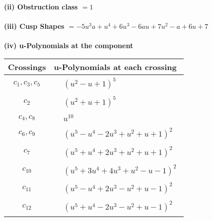 \documentclass[1p]{elsarticle_modified}
\theoremstyle{definition}
\begin{document}
\flushleft \textbf{(ii) Obstruction class $= 1$}\\~\\
\flushleft \textbf{(iii) Cusp Shapes $= -5 u^3 a+u^4+6 u^3-6 a u+7 u^2- a+6 u+7$}\\~\\
\newpage\renewcommand{\arraystretch}{1}
\flushleft \textbf{(iv) u-Polynomials at the component}\newline \\
\begin{tabular}{m{50pt}|m{274pt}}
Crossings & \hspace{64pt}u-Polynomials at each crossing \\
\hline $$\begin{aligned}c_{1},c_{3},c_{5}\end{aligned}$$&$\begin{aligned}
&(u^2- u+1)^5
\end{aligned}$\\
\hline $$\begin{aligned}c_{2}\end{aligned}$$&$\begin{aligned}
&(u^2+u+1)^5
\end{aligned}$\\
\hline $$\begin{aligned}c_{4},c_{8}\end{aligned}$$&$\begin{aligned}
&u^{10}
\end{aligned}$\\
\hline $$\begin{aligned}c_{6},c_{9}\end{aligned}$$&$\begin{aligned}
&(u^5- u^4-2 u^3+u^2+u+1)^2
\end{aligned}$\\
\hline $$\begin{aligned}c_{7}\end{aligned}$$&$\begin{aligned}
&(u^5+u^4+2 u^3+u^2+u+1)^2
\end{aligned}$\\
\hline $$\begin{aligned}c_{10}\end{aligned}$$&$\begin{aligned}
&(u^5+3 u^4+4 u^3+u^2- u-1)^2
\end{aligned}$\\
\hline $$\begin{aligned}c_{11}\end{aligned}$$&$\begin{aligned}
&(u^5- u^4+2 u^3- u^2+u-1)^2
\end{aligned}$\\
\hline $$\begin{aligned}c_{12}\end{aligned}$$&$\begin{aligned}
&(u^5+u^4-2 u^3- u^2+u-1)^2
\end{aligned}$\\
\hline
\end{tabular}\\~\\
\end{document}
